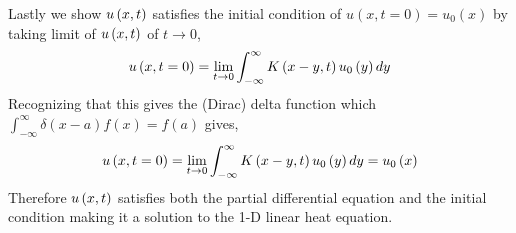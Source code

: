 Lastly we show $u\left(x,t\right)$ satisfies the initial condition of $u\left(x, t= 0\right) = u_{0} \left( x\right)$ 
by taking limit of $u\left(x,t\right)$ of $t \rightarrow 0$, 
\begin{equation}
    u\left(x, t= 0\right) = \lim_{ t \to 0 } \int_{-\infty}^{\infty} K\left(x-y,t\right) u_{0}\left( y \right) dy
    \label{eq:p4-14}
\end{equation}
Recognizing that this gives the (Dirac) delta function which 
$\int_{-\infty}^{\infty} \delta \left(x-a \right)f(x) = f(a) $ 
gives,
\begin{equation}
    u\left(x, t= 0\right) = \lim_{ t \to 0 } \int_{-\infty}^{\infty} K\left(x-y,t\right) u_{0}\left( y \right) dy =
    u_{0}\left( x \right)
    \label{eq:p4-14}
\end{equation}
Therefore $u\left(x,t\right)$ satisfies both the partial differential equation and the initial condition
making it a solution to the 1-D linear heat equation.
    






    




